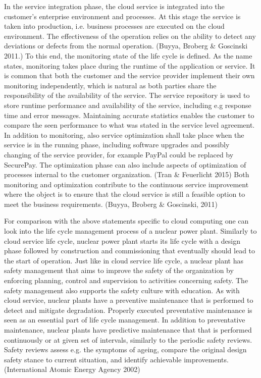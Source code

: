 \documentclass{article}
\begin{document}
In the service integration phase, the cloud service is integrated into the customer's enterprise environment and processes. At this stage the service is taken into production, i.e. business processes are executed on the cloud environment. The effectiveness of the operation relies on the ability to detect any deviations or defects from the normal operation. (Buyya, Broberg \& Goscinski 2011.) To this end, the monitoring state of the life cycle is defined. As the name states, monitoring takes place during the runtime of the application or service. It is common that both the customer and the service provider implement their own monitoring independently, which is natural as both parties share the responsibility of the availability of the service. The service repository is used to store runtime performance and availability of the service, including e.g response time and error messages. Maintaining accurate statistics enables  the customer to compare the seen performance to what was stated in the service level agreement. In addition to monitoring, also service optimization shall take place when the service is in the running phase, including software upgrades and possibly changing of the service provider, for example PayPal could be replaced by SecurePay. The optimization phase can also include aspects of optimization of processes internal to the customer organization. (Tran \& Feuerlicht 2015) Both monitoring and optimization contribute to the continuous service improvement where the object is to ensure that the cloud service is still a feasible option to meet the business requirements. (Buyya, Broberg \& Goscinski, 2011)
\par
For comparison with the above statements specific to cloud computing one can look into the life cycle management process of a nuclear power plant. Similarly to cloud service life cycle, nuclear power plant starts its life cycle with a design phase followed by construction and commissioning that eventually should lead to the start of operation. Just like in cloud service life cycle, a nuclear plant has safety management that aims to improve the safety of the organization by enforcing planning, control and supervision to activities concerning safety. The safety management also supports the safety culture with education. As with cloud service, nuclear plants have a preventive maintenance that is performed to detect and mitigate degradation. Properly executed preventative maintenance is seen as an essential part of life cycle management. In addition to preventative maintenance, nuclear plants have predictive maintenance that that is performed continuously or at given set of intervals, similarly to the periodic safety reviews. Safety reviews assess e.g. the symptoms of ageing, compare the original design safety stance to current situation, and identify achievable improvements. (International Atomic Energy Agency 2002) 
\end{document}
